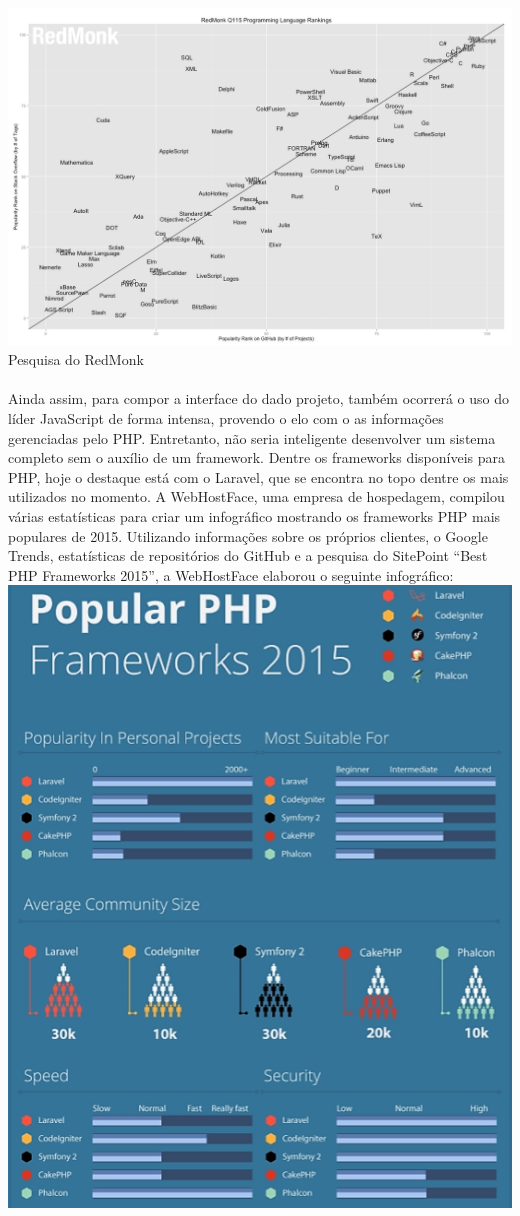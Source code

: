 \includegraphics[width=17cm]{img/grafico_redmonk} 
Pesquisa do RedMonk\\ \\
Ainda assim, para compor a interface do dado projeto, também ocorrerá o uso do líder JavaScript de forma intensa, provendo o elo com o as informações gerenciadas pelo PHP.
Entretanto, não seria inteligente desenvolver um sistema completo sem o auxílio de um framework. Dentre os frameworks disponíveis para PHP, hoje o destaque está com o Laravel, que se encontra no topo dentre os mais utilizados no momento. 
A WebHostFace, uma empresa de hospedagem, compilou várias estatísticas para criar um infográfico mostrando os frameworks PHP mais populares de 2015. Utilizando informações sobre os próprios clientes, o Google Trends, estatísticas de repositórios do GitHub e a pesquisa do SitePoint “Best PHP Frameworks 2015”, a WebHostFace elaborou o seguinte infográfico: \\
\includegraphics{img/infografico_webhostface} \\
